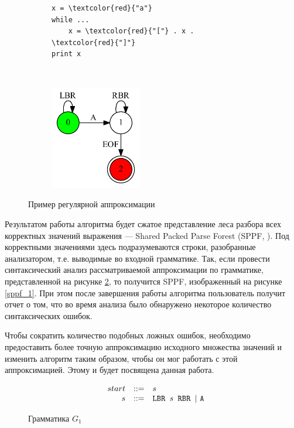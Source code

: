 \documentclass[14pt]{matmex-diploma-custom}
\begin{document}
\begin{figure}[t]
    \centering
	\begin{subfigure}{0.4\textwidth}
	    \centering
	    \begin{minipage}{4cm}
		    \begin{Verbatim}[commandchars=\\\{\}]
x = \textcolor{red}{"a"}
while ...
    x = \textcolor{red}{"["} . x . \textcolor{red}{"]"}
print x
		    \end{Verbatim}
		\end{minipage}
	\end{subfigure}
	~
	\begin{subfigure}{0.4\textwidth}
	\centering
		\includegraphics[width=4cm]{pictures/reg_app.pdf}	
	\end{subfigure}
	\caption{Пример регулярной аппроксимации}
	\label{reg_app_ex}
\end{figure}

Результатом работы алгоритма будет сжатое представление леса разбора всех корректных значений выражения --- Shared Packed Parse Forest (SPPF, \cite{sppf}). Под корректными значениями здесь подразумеваются строки, разобранные анализатором, т.е. выводимые во входной грамматике. Так, если провести синтаксический анализ рассматриваемой аппроксимации по грамматике, представленной на рисунке \ref{g_1}, то получится SPPF, изображенный на рисунке \ref{sppf_1}. При этом после завершения работы алгоритма пользователь получит отчет о том, что во время анализа было обнаружено некоторое количество синтаксических ошибок.

Чтобы сократить количество подобных ложных ошибок, необходимо предоставить более точную аппроксимацию исходного множества значений и изменить алгоритм таким образом, чтобы он мог работать с этой аппроксимацией. Этому и будет посвящена данная работа.   

\begin{figure}[t]
\centering
$$
	\begin{array}{crcl}
		&start &::=& s \\
		&s & ::= & \mbox{\texttt{LBR }} s \mbox{\texttt{ RBR }} | \ \mbox{\texttt{A}}\\
	\end{array}
$$
\caption{Грамматика $G_1$}
\label{g_1}
\end{figure}
\end{document}
